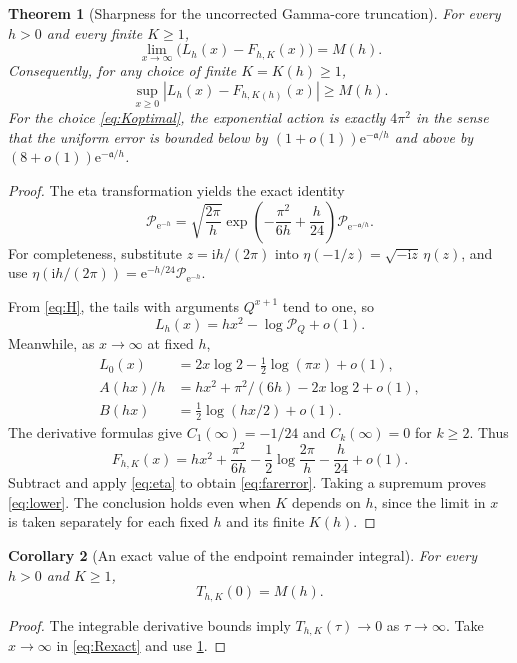 \documentclass[11pt,a4paper]{article}
\numberwithin{equation}{section}
\newtheorem{theorem}{Theorem}[section]
\newtheorem{corollary}[theorem]{Corollary}
\theoremstyle{definition}
\newcommand{\ii}{\mathrm i}
\newcommand{\ee}{\mathrm e}
\newcommand{\Act}{\mathfrak a}
\newcommand{\Pq}{\mathcal P}
\begin{document}
\begin{theorem}[Sharpness for the uncorrected Gamma-core truncation]
\label{thm:sharp}
For every $h>0$ and every finite $K\ge1$,
\begin{equation}
\lim_{x\to\infty}\bigl(L_h(x)-F_{h,K}(x)\bigr)=M(h).
\label{eq:farerror}
\end{equation}
Consequently, for any choice of finite $K=K(h)\ge1$,
\begin{equation}
\sup_{x\ge0}|L_h(x)-F_{h,K(h)}(x)|\ge M(h).
\label{eq:lower}
\end{equation}
For the choice \eqref{eq:Koptimal}, the exponential action is exactly $4\pi^2$ in the sense that the uniform error is bounded below by $(1+o(1))\ee^{-\Act/h}$ and above by $(8+o(1))\ee^{-\Act/h}$.
\end{theorem}
\begin{proof}
The eta transformation yields the exact identity \cite{dlmfeta}
\begin{equation}
\Pq_{\ee^{-h}}=
 \sqrt{\frac{2\pi}{h}}
 \exp\left(-\frac{\pi^2}{6h}+\frac h{24}\right)
 \Pq_{\ee^{-\Act/h}}.
\label{eq:eta}
\end{equation}
For completeness, substitute $z=\ii h/(2\pi)$ into
$\eta(-1/z)=\sqrt{-\ii z}\,\eta(z)$, and use
$\eta(\ii h/(2\pi))=\ee^{-h/24}\Pq_{\ee^{-h}}$.

From \eqref{eq:H}, the tails with arguments $Q^{x+1}$ tend to one, so
\[
L_h(x)=hx^2-\log\Pq_Q+o(1).
\]
Meanwhile, as $x\to\infty$ at fixed $h$,
\begin{align*}
L_0(x)&=2x\log2-\tfrac12\log(\pi x)+o(1),\\
A(hx)/h&=hx^2+\pi^2/(6h)-2x\log2+o(1),\\
B(hx)&=\tfrac12\log(hx/2)+o(1).
\end{align*}
The derivative formulas give $C_1(\infty)=-1/24$ and $C_k(\infty)=0$ for $k\ge2$. Thus
\[
F_{h,K}(x)=hx^2+\frac{\pi^2}{6h}
                 -\frac12\log\frac{2\pi}{h}-\frac h{24}+o(1).
\]
Subtract and apply \eqref{eq:eta} to obtain \eqref{eq:farerror}. Taking a supremum proves \eqref{eq:lower}. The conclusion holds even when $K$ depends on $h$, since the limit in $x$ is taken separately for each fixed $h$ and its finite $K(h)$.
\end{proof}

\begin{corollary}[An exact value of the endpoint remainder integral]
\label{cor:Tzero}
For every $h>0$ and $K\ge1$,
\[
T_{h,K}(0)=M(h).
\]
\end{corollary}
\begin{proof}
The integrable derivative bounds imply $T_{h,K}(\tau)\to0$ as $\tau\to\infty$. Take $x\to\infty$ in \eqref{eq:Rexact} and use \cref{thm:sharp}.
\end{proof}
\end{document}
